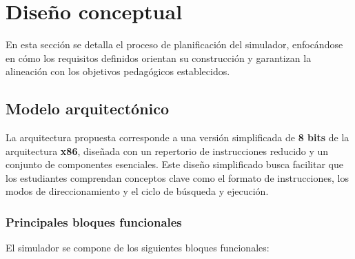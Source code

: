 \documentclass[12pt,oneside]{templates/unerthesis}
\begin{document}
\hypertarget{diseuxf1o-conceptual}{%
\section{Diseño conceptual}\label{diseuxf1o-conceptual}}

En esta sección se detalla el proceso de planificación del simulador, enfocándose en cómo los requisitos definidos orientan su construcción y garantizan la alineación con los objetivos pedagógicos establecidos.

\hypertarget{modelo-arquitectuxf3nico}{%
\subsection{Modelo arquitectónico}\label{modelo-arquitectuxf3nico}}

La arquitectura propuesta corresponde a una versión simplificada de \textbf{8 bits} de la arquitectura \textbf{x86}, diseñada con un repertorio de instrucciones reducido y un conjunto de componentes esenciales. Este diseño simplificado busca facilitar que los estudiantes comprendan conceptos clave como el formato de instrucciones, los modos de direccionamiento y el ciclo de búsqueda y ejecución.

\hypertarget{principales-bloques-funcionales}{%
\subsubsection{Principales bloques funcionales}\label{principales-bloques-funcionales}}

El simulador se compone de los siguientes bloques funcionales:

\begin{table}[!h]
\centering
\caption{\label{tab:bloquesfuncionales}Bloques funcionales principales}
\centering
{}
\end{table}
\end{document}
